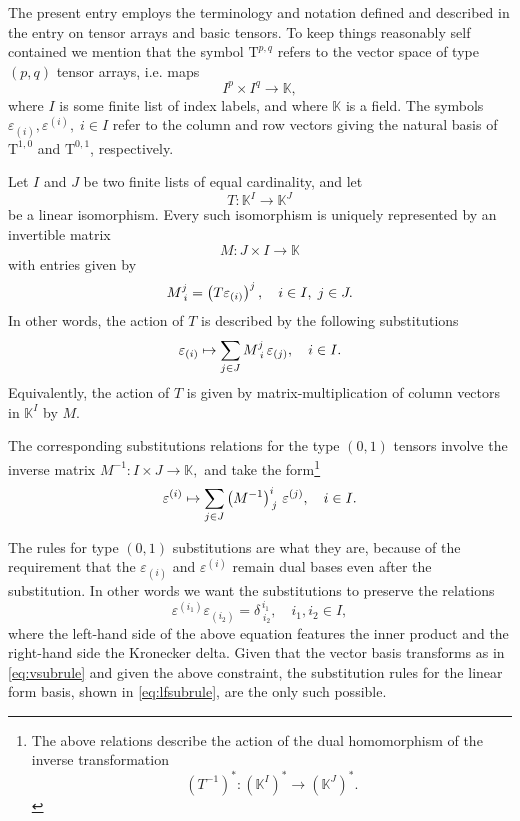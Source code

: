 \documentclass[12pt]{article}
\newcommand{\kfield}{\mathbb{K}}
\newcommand{\rT}{\mathrm{T}}
\newcommand{\tspace}[1]{\rT^{#1}}
\newcommand{\ca}{\varepsilon}
\newcommand{\ud}[2]{^{#1}_{\!\hphantom{#1}#2}}
\newcommand{\lp}{\left(}
\newcommand{\rp}{\right)}
\begin{document}
The present entry employs the terminology and notation defined
and described in the entry on tensor arrays and basic tensors.  To keep things
reasonably self contained we mention that the symbol $\tspace{p,q}$ refers
to the vector space of type $(p,q)$ tensor arrays, i.e. maps
$$I^p\times I^q\rightarrow \kfield,$$
where $I$ is some finite list of
index labels, and where $\kfield$ is a field.  The symbols $\ca_{(i)},
\ca^{(i)},\; i\in I$ refer to the column and row vectors giving the
natural basis of $\tspace{1,0}$ and $\tspace{0,1}$, respectively.

Let $I$ and $J$ be two finite lists of equal cardinality, and let
 $$T:\kfield^I\rightarrow\kfield^J$$ be a linear isomorphism.  Every
such isomorphism is uniquely represented by an invertible matrix
$$M:J\times I\rightarrow \kfield$$ with entries given by $$M\ud{j}{i}
= \lp T\ca_{(i)}\rp^j,\quad i\in I,\; j\in J.$$ In other words, the
action of $T$ is described by the following substitutions
\begin{equation}
  \label{eq:vsubrule}
  \ca_{(i)} \mapsto \sum_{j\in J} M\ud{j}{i}\, \ca_{(j)},\quad i\in I.  
\end{equation}
Equivalently, the action of $T$ is given by matrix-multiplication
of column vectors in $\kfield^I$ by $M$.  

The corresponding substitutions relations for the type $(0,1)$ tensors
involve the inverse matrix $M^{-1}: I\times J\rightarrow \kfield,$ and
take the form\footnote{The above relations describe the action of the dual homomorphism of the
inverse transformation
$$\lp T^{-1} \rp ^*: \lp \kfield^I \rp^* \rightarrow \lp \kfield^J
\rp^*.$$}
\begin{equation}
  \label{eq:lfsubrule}
  \ca^{(i)} \mapsto \sum_{j\in J} \lp M^{-1} \rp\ud{i}{j}\,
\ca^{(j)},\quad i\in I.  
\end{equation}

The rules for type $(0,1)$ substitutions are what they are, because of
the requirement that the $\ca_{(i)}$ and $\ca^{(i)}$ remain dual bases
even after the substitution.  In other words we want the substitutions
to preserve the relations
$$\ca^{(i_1)}\ca_{(i_2)} = \delta^{\,i_1}_{\;i_2},\quad i_1, i_2\in
I,$$
where the left-hand side of the above equation features the inner
product and the right-hand side the Kronecker delta.  Given that the
vector basis transforms as in \eqref{eq:vsubrule} and given the above
constraint, the substitution rules for the linear form basis, shown in
\eqref{eq:lfsubrule}, are the only such possible.
\end{document}
